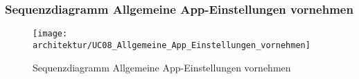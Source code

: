 \pagebreak
\subsubsection{Sequenzdiagramm Allgemeine App-Einstellungen vornehmen}
\begin{figure}[H]
	\centering
		\texttt{[image: architektur/UC08\_Allgemeine\_App\_Einstellungen\_vornehmen]}
	\caption{Sequenzdiagramm Allgemeine App-Einstellungen vornehmen}
	\label{fig:UC08_Allgemeine_App_Einstellungen_vornehmen}
\end{figure}
\FloatBarrier
